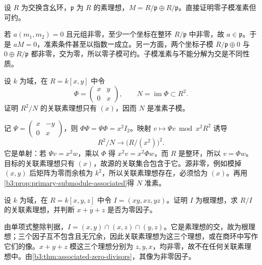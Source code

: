 \begin{exercise}\label{b3:ex:04-primary-not-irreducible-module}
	设 \(R\) 为交换含幺环，\(\mathfrak p\) 为 \(R\) 的素理想，\(M=R/\mathfrak p\oplus R/\mathfrak p\)。直接证明零子模准素但可约。
\end{exercise}
\begin{solution}
	若 \(a(m_1,m_2)=0\) 且元组非零，至少一个坐标在整环 \(R/\mathfrak p\) 中非零，故 \(a\in\mathfrak p\)。于是 \(aM=0\)，准素条件甚至以指数一成立。另一方面，两个坐标子模 \(R/\mathfrak p\oplus0\) 与 \(0\oplus R/\mathfrak p\) 都非零，交为零，所以零子模可约。子模准素与不能分解为交是不同性质。
\end{solution}

\begin{exercise}\label{b3:ex:04-triangular-presentation}
	设 \(k\) 为域，在 \(R=k[x,y]\) 中令
	\[
		\Phi=\begin{pmatrix}x&y\\0&x\end{pmatrix},\qquad
		N=\operatorname{im}\Phi\subset R^2.
	\]
	证明 \(R^2/N\) 的关联素理想只有 \((x)\)，因而 \(N\) 是准素子模。
\end{exercise}
\begin{solution}
	记 \(\Psi=\begin{pmatrix}x&-y\\0&x\end{pmatrix}\)，则 \(\Phi\Psi=\Psi\Phi=x^2I_2\)。映射 \(v\mapsto\Psi v\bmod x^2R^2\) 诱导
	\[
		R^2/N\longrightarrow\bigl(R/(x^2)\bigr)^2.
	\]
	它是单射：若 \(\Psi v=x^2w\)，乘以 \(\Phi\) 得 \(x^2v=x^2\Phi w\)，而 \(R\) 是整环，所以 \(v=\Phi w\)。目标的关联素理想只有 \((x)\)，故源的关联集合包含于它。源非零，例如模掉 \((x,y)\) 后矩阵为零而余核为 \(k^2\)，所以关联素理想存在，必须恰为 \((x)\)。再用\cref{b3:prop:primary-submodule-associated}得 \(N\) 准素。
\end{solution}

\begin{exercise}\label{b3:ex:04-three-axes}
	设 \(k\) 为域，在 \(R=k[x,y,z]\) 中令 \(I=(xy,xz,yz)\)。证明 \(I\) 为根理想，求 \(R/I\) 的关联素理想，并判断 \(\overline{x+y+z}\) 是否为零因子。
\end{exercise}
\begin{solution}
	由单项式整除判据，\(I=(x,y)\cap(x,z)\cap(y,z)\)。它是素理想的交，故为根理想；三个因子互不包含且无冗余，因此关联素理想为这三个理想，或在商环中写作它们的像。\(x+y+z\) 模这三个理想分别为 \(z,y,x\)，均非零，故不在任何关联素理想中。由\cref{b3:thm:associated-zero-divisors}，其像为非零因子。
\end{solution}

